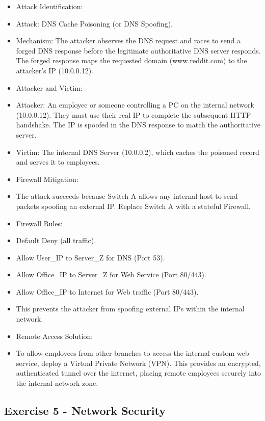 \documentclass{article}
\begin{document}
\begin{itemize}
    \item[\textbf{1.}] Attack Identification:
    \item Attack: DNS Cache Poisoning (or DNS Spoofing).
    \item Mechanism: The attacker observes the DNS request and races to send a forged DNS response before the legitimate authoritative DNS server responds. The forged response maps the requested domain (www.reddit.com) to the attacker's IP (10.0.0.12).

    \item[\textbf{2.}] Attacker and Victim:
    \item Attacker: An employee or someone controlling a PC on the internal network (10.0.0.12). They must use their real IP to complete the subsequent HTTP handshake. The IP is spoofed in the DNS response to match the authoritative server.
    \item Victim: The internal DNS Server (10.0.0.2), which caches the poisoned record and serves it to employees.

    \item[\textbf{3.}] Firewall Mitigation:
    \item The attack succeeds because Switch A allows any internal host to send packets spoofing an external IP. Replace Switch A with a stateful Firewall.
    \item Firewall Rules:
    \item Default Deny (all traffic).
    \item Allow User\_IP to Server\_Z for DNS (Port 53).
    \item Allow Office\_IP to Server\_Z for Web Service (Port 80/443).
    \item Allow Office\_IP to Internet for Web traffic (Port 80/443).
    \item This prevents the attacker from spoofing external IPs within the internal network.

    \item[\textbf{4.}] Remote Access Solution:
    \item To allow employees from other branches to access the internal custom web service, deploy a Virtual Private Network (VPN). This provides an encrypted, authenticated tunnel over the internet, placing remote employees securely into the internal network zone.
\end{itemize}

\subsection{Exercise 5 - Network Security}
\end{document}

